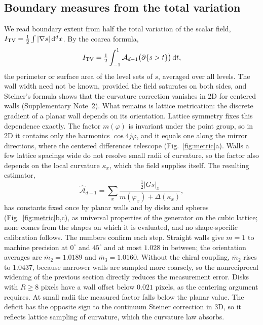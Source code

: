 \documentclass[11pt,a4paper]{article}
\newcommand{\dd}{\mathrm{d}}
\begin{document}
\subsection*{Boundary measures from the total variation}
We read boundary extent from half the total variation of the scalar field, $I_{\rm TV}=\tfrac12\int|\nabla s|\,\dd^dx$. By the coarea formula,
\begin{equation}
I_{\rm TV}=\tfrac12\int_{-1}^{1}\mathcal A_{d-1}\bigl(\partial\{s>t\}\bigr)\,\dd t ,
\label{eq:coarea}
\end{equation}
the perimeter or surface area of the level sets of $s$, averaged over all levels. The wall width need not be known, provided the field saturates on both sides, and Steiner's formula shows that the curvature correction vanishes in 2D for centered walls (Supplementary Note~2). What remains is lattice metrication: the discrete gradient of a planar wall depends on its orientation. Lattice symmetry fixes this dependence exactly. The factor $m(\varphi)$ is invariant under the point group, so in 2D it contains only the harmonics $\cos4j\varphi$, and it equals one along the mirror directions, where the centered differences telescope (Fig.~\ref{fig:metric}a). Walls a few lattice spacings wide do not resolve small radii of curvature, so the factor also depends on the local curvature $\kappa_x$, which the field supplies itself. The resulting estimator,
\begin{equation}
\widehat{\mathcal A}_{d-1}=\sum_x\frac{\tfrac12|Gs|_x}{m(\varphi_x)+\Delta(\kappa_x)},
\label{eq:refree}
\end{equation}
has constants fixed once by planar walls and by disks and spheres (Fig.~\ref{fig:metric}b,c), as universal properties of the generator on the cubic lattice; none comes from the shapes on which it is evaluated, and no shape-specific calibration follows. The numbers confirm each step. Straight walls give $m=1$ to machine precision at $0^\circ$ and $45^\circ$ and at most $1.028$ in between; the orientation averages are $\bar m_2=1.0189$ and $\bar m_3=1.0160$. Without the chiral coupling, $\bar m_2$ rises to $1.0437$, because narrower walls are sampled more coarsely, so the nonreciprocal widening of the previous section directly reduces the measurement error. Disks with $R\ge8$ pixels have a wall offset below $0.021$ pixels, as the centering argument requires. At small radii the measured factor falls below the planar value. The deficit has the opposite sign to the continuum Steiner correction in 3D, so it reflects lattice sampling of curvature, which the curvature law absorbs.
\end{document}
